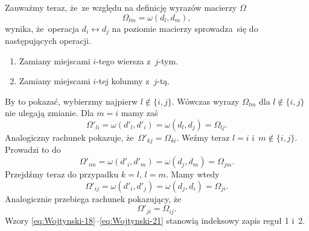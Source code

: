 \documentclass[a4paper,11pt]{article}
\numberwithin{equation}{section}
\begin{document}
Zauważmy teraz, że~ze względu na definicję wyrazów macierzy $\Omega$
\begin{equation}
  \label{eq:Wojtynski-17}
  \Omega_{ l m } = \omega( d_{ l }, d_{ m } ),
\end{equation}
wynika, że~operacja $d_{ i } \leftrightarrow d_{ j }$ na poziomie macierzy sprowadza~się
do następujących operacji.
\begin{enumerate}

\item Zamiany miejscami $i$-tego wiersza z~$j$-tym.

\item Zamiany miejscami $i$-tej kolumny z~$j$-tą.

\end{enumerate}
By to pokazać, wybierzmy najpierw $l \notin \{ i, j \}$. Wówczas wyrazy
$\Omega_{ l m }$ dla $l \notin \{ i, j \}$ nie ulegają zmianie. Dla $m = i$ mamy zaś
\begin{equation}
  \label{eq:Wojtynski-18}
  \Omega'_{ l i } = \omega( d'_{ l }, d'_{ i } ) = \omega( d_{ l }, d_{ j } ) =
  \Omega_{ l j }.
\end{equation}
Analogiczny rachunek pokazuje, że~$\Omega'_{ k j } = \Omega_{ k i }$. Weźmy teraz
$l = i$ i~$m \notin \{ i, j \}$. Prowadzi to do
\begin{equation}
  \label{eq:Wojtynski-19}
  \Omega'_{ i m } = \omega( d'_{ i }, d'_{ m } ) = \omega( d_{ j }, d_{ m } ) =
  \Omega_{ j m }.
\end{equation}
Przejdźmy teraz do przypadku $k = l$, $l = m$. Mamy wtedy
\begin{equation}
  \label{eq:Wojtynski-20}
  \Omega'_{ i j } = \omega( d'_{ i }, d'_{ j } ) = \omega( d_{ j }, d_{ i } ) =
  \Omega_{ j i }.
\end{equation}
Analogicznie przebiega rachunek pokazujący, że
\begin{equation}
  \label{eq:Wojtynski-21}
  \Omega'_{ j i } = \Omega_{ i j }.
\end{equation}
Wzory \eqref{eq:Wojtynski-18}--\eqref{eq:Wojtynski-21} stanowią indeksowy
zapis reguł 1 i~2.
\end{document}
